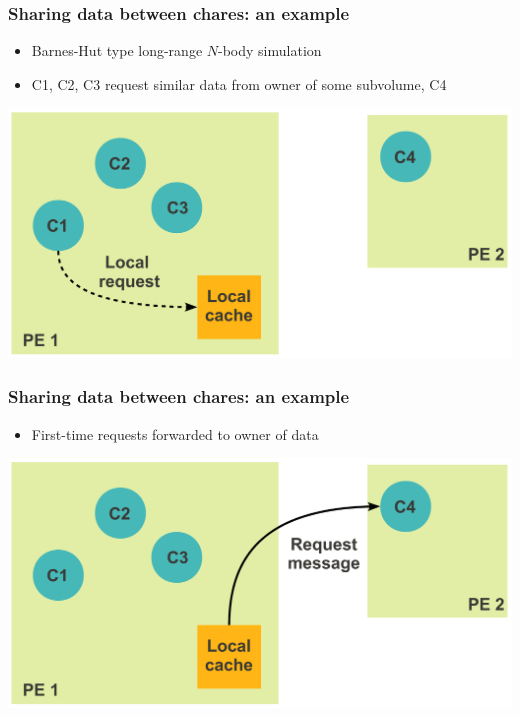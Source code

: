 \begin{frame}[fragile]
  \frametitle{Sharing data between chares: an example}
  \begin{itemize}
    \item Barnes-Hut type long-range $N$-body simulation
    \item C1, C2, C3 request similar data from owner of some subvolume, C4
  \end{itemize}
  \includegraphics[width=\textwidth]{figures/advancedOpts/fig4}
\end{frame}

\begin{frame}[fragile]
  \frametitle{Sharing data between chares: an example}
  \begin{itemize}
    \item First-time requests forwarded to owner of data 
  \end{itemize}
  \includegraphics[width=\textwidth]{figures/advancedOpts/fig5}
\end{frame}

